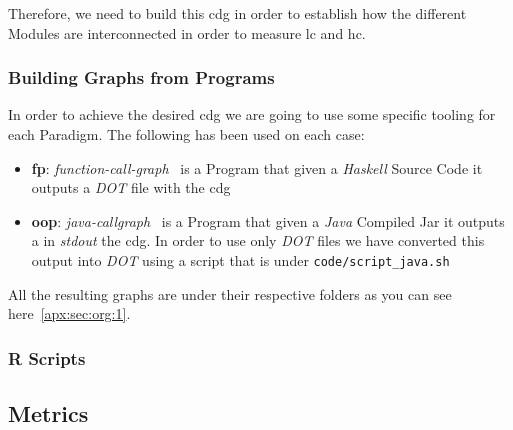 \documentclass[12pt, a4paper]{article}
\begin{document}
Therefore, we need to build this \acrlong{cdg} in order to establish how the different Modules are interconnected in order to measure \acrshort{lc} and \acrshort{hc}.

\subsubsection{Building Graphs from Programs}
In order to achieve the desired \acrlong{cdg} we are going to use some specific tooling for each Paradigm.
The following has been used on each case:

\begin{itemize}
    \item \textbf{\acrlong{fp}}: \textit{function-call-graph}~\cite{fp_callgraph} is a Program that given a \textit{Haskell} Source Code it outputs a \textit{DOT} file with the \acrlong{cdg}
    \item \textbf{\acrlong{oop}}: \textit{java-callgraph}~\cite{java_callgraph} is a Program that given a \textit{Java} Compiled Jar it outputs a in \textit{stdout} the \acrlong{cdg}. In order to use only \textit{DOT} files we have converted this output into \textit{DOT} using a script that is under \texttt{code/script_java.sh}
\end{itemize}

All the resulting graphs are under their respective folders as you can see here~\ref{apx:sec:org:1}.

\subsubsection{R Scripts}

\subsection{Metrics}
\end{document}
